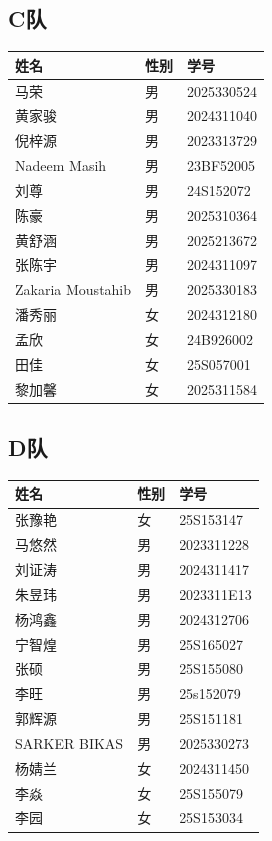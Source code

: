 \documentclass{ctexart}
\begin{document}
\subsection*{C队}
\renewcommand{\arraystretch}{1.2}
\begin{tabularx}{\textwidth}{@{} L{3.2cm} M{2cm} X @{}}
    \toprule
    \textbf{姓名} & \textbf{性别} & \textbf{学号} \\
    \midrule
    马荣 & 男 & 2025330524 \\
    黄家骏 & 男 & 2024311040 \\
    倪梓源 & 男 & 2023313729 \\
    Nadeem Masih & 男 & 23BF52005 \\
    刘尊 & 男 & 24S152072 \\
    陈豪 & 男 & 2025310364 \\
    黄舒涵 & 男 & 2025213672 \\
    张陈宇 & 男 & 2024311097 \\
    Zakaria Moustahib & 男 & 2025330183 \\
    潘秀丽 & 女 & 2024312180 \\
    孟欣 & 女 & 24B926002 \\
    田佳 & 女 & 25S057001 \\
    黎加馨 & 女 & 2025311584 \\
    \bottomrule
\end{tabularx}

\subsection*{D队}
\renewcommand{\arraystretch}{1.2}
\begin{tabularx}{\textwidth}{@{} L{3.2cm} M{2cm} X @{}}
    \toprule
    \textbf{姓名} & \textbf{性别} & \textbf{学号} \\
    \midrule
    张豫艳 & 女 & 25S153147 \\
    马悠然 & 男 & 2023311228 \\
    刘证涛 & 男 & 2024311417 \\
    朱昱玮 & 男 & 2023311E13 \\
    杨鸿鑫 & 男 & 2024312706 \\
    宁智煌 & 男 & 25S165027 \\
    张硕 & 男 & 25S155080 \\
    李旺 & 男 & 25s152079 \\
    郭辉源 & 男 & 25S151181 \\
    SARKER BIKAS & 男 & 2025330273 \\
    杨婧兰 & 女 & 2024311450 \\
    李焱 & 女 & 25S155079 \\
    李园 & 女 & 25S153034 \\
    \bottomrule
\end{tabularx}
\end{document}
